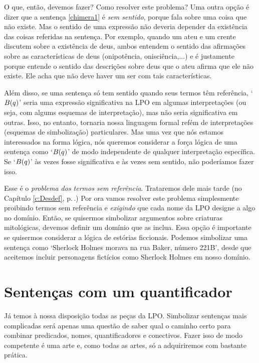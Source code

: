 O que, então, devemos fazer? Como resolver este problema?
Uma outra opção é dizer que a sentença \ref{chimera1} é \emph{sem sentido}, porque fala sobre uma coisa que não existe.
Mas o sentido de uma expressão não deveria depender da existência das coisas referidas na sentença.
Por exemplo, quando um ateu e um crente discutem sobre a existência de deus, ambos entendem o sentido das afirmações sobre as características de deus (onipotência, onisciência,...) e é justamente porque entende o sentido das descrições sobre deus que o ateu afirma que ele não existe.
Ele acha que não deve haver um ser com tais características.
 
Além disso, se uma sentença só tem sentido quando seus termos têm referência, `$\mathord{B}(q)$' seria uma expressão significativa na LPO em algumas interpretações (ou seja, com algums esquemas de interpretação), mas não seria significativa em outras.
Isso, no entanto, tornaria nossa linguagem formal refém de interpretações (esquemas de simbolização) particulares.
Mas uma vez que nós estamos interessados na forma lógica, nós queremos considerar a força lógica de uma sentença como `$\mathord{B}(q)$' de modo independente de qualquer interpretação específica.
Se `$\mathord{B}(q)$' às vezes fosse significativa e às vezes sem sentido, não poderíamos fazer isso.

Esse é o \emph{problema dos termos sem referência}.
Trataremos dele mais tarde (no Capítulo \ref{c:Desdef}, p.\,\pageref{c:Desdef}.)
Por ora vamos resolver este problema simplesmente proibindo termos sem referência e \emph{exigindo} que cada nome da LPO designe a algo no domínio.
Então, se quisermos simbolizar argumentos sobre criaturas mitológicas, devemos definir um domínio que as inclua.
Essa opção é importante se quisermos considerar a lógica de estórias ficcionais. Podemos simbolizar uma sentença como `Sherlock Holmes morava na rua Baker, número 221B', desde que aceitemos incluir personagens fictícios como Sherlock Holmes em nosso domínio.


\chapter{Sentenças com um quantificador}
\label{s:MoreMonadic}

Já temos à nossa disposição todas as peças da LPO.
Simbolizar sentenças mais complicadas será apenas uma questão de saber qual o caminho certo para combinar predicados, nomes, quantificadores e conectivos. Fazer isso de modo competente é uma arte e, como todas as artes,  só a adquiriremos com bastante prática.


